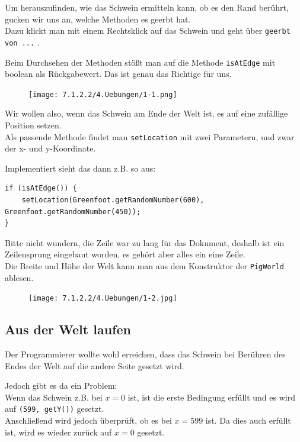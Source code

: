 \documentclass{scrartcl}   %
\begin{document}
Um herauszufinden, wie das Schwein ermitteln kann, ob es den Rand berührt, gucken wir uns an, welche Methoden es geerbt hat.\\
Dazu klickt man mit einem Rechtsklick auf das Schwein und geht über \texttt{geerbt von ...} .

Beim Durchsehen der Methoden stößt man auf die Methode \texttt{isAtEdge} mit boolean als Rückgabewert. Das ist genau das Richtige für uns.\\

\begin{figure}[ht]
	\centering
	\texttt{[image: 7.1.2.2/4.Uebungen/1-1.png]}
\end{figure}

Wir wollen also, wenn das Schwein am Ende der Welt ist, es auf eine zufällige Position setzen.\\
Als passende Methode findet man \texttt{setLocation} mit zwei Parametern, und zwar der x- und y-Koordinate.

\newpage

Implementiert sieht das dann z.B. so aus:\\
\begin{lstlisting}
if (isAtEdge()) {
    setLocation(Greenfoot.getRandomNumber(600), Greenfoot.getRandomNumber(450));
}
\end{lstlisting}

Bitte nicht wundern, die Zeile war zu lang für das Dokument, deshalb ist ein Zeilensprung eingebaut worden, es gehört aber alles ein eine Zeile.\\

Die Breite und Höhe der Welt kann man aus dem Konstruktor der \texttt{PigWorld} ablesen.\\

\begin{figure}[ht]
	\centering
	\texttt{[image: 7.1.2.2/4.Uebungen/1-2.jpg]}
\end{figure}

\subsection{Aus der Welt laufen}

Der Programmierer wollte wohl erreichen, dass das Schwein bei Berühren des Endes der Welt auf die andere Seite gesetzt wird.

Jedoch gibt es da ein Problem:\\
Wenn das Schwein z.B. bei $x=0$ ist, ist die erste Bedingung erfüllt und es wird auf \texttt{(599, getY())} gesetzt.\\
Anschließend wird jedoch überprüft, ob es bei $x=599$ ist. Da dies auch erfüllt ist, wird es wieder zurück auf $x=0$ gesetzt.
\end{document}
